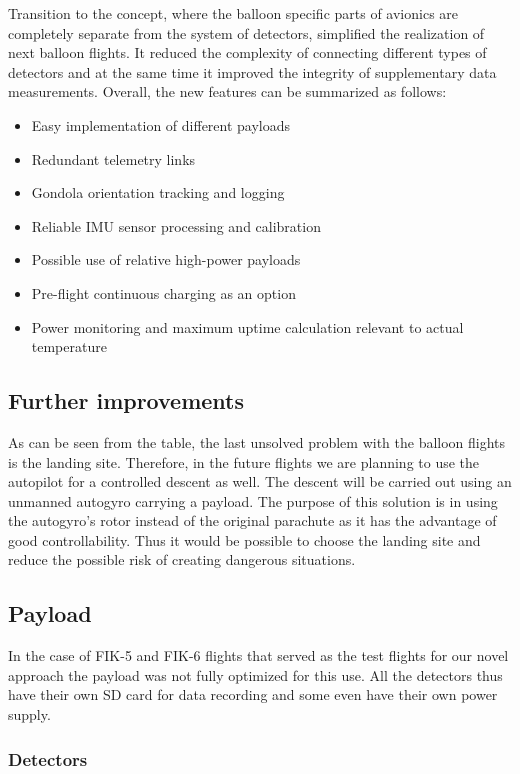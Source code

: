 \documentclass{Rpd}
\begin{document}
Transition to the concept, where the balloon specific parts of avionics are completely separate from the system of detectors, simplified the realization of next balloon flights. It reduced the complexity of connecting different types of detectors and at the same time it improved the integrity of supplementary data measurements. Overall, the new features can be summarized as follows:

\begin{itemize}
\item Easy implementation of different payloads
\item Redundant telemetry links
\item Gondola orientation tracking and logging
\item Reliable IMU sensor processing and calibration
\item Possible use of relative high-power payloads
\item Pre-flight continuous charging as an option
\item Power monitoring and maximum uptime calculation relevant to actual temperature
\end{itemize}


\subsection{Further improvements}

As can be seen from the table, the last unsolved problem with the balloon flights is the landing site. Therefore, in the future flights we are planning to use the autopilot for a controlled descent as well.
The descent will be carried out using an unmanned autogyro carrying a payload. The purpose of this solution is in using the autogyro’s rotor instead of the original parachute as it has the advantage of good controllability. Thus it would be possible to choose the landing site and reduce the possible risk of creating dangerous situations. 

\subsection{Payload}
In the case of FIK-5 and FIK-6 flights that served as the test flights for our novel approach the payload was not fully optimized for this use. All the detectors thus have their own SD card for data recording and some even have their own power supply.


\subsubsection{Detectors}
\end{document}
